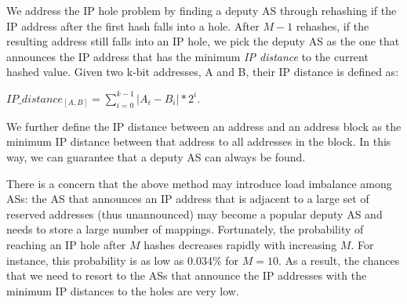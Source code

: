 
We address the IP hole problem by finding a deputy AS through rehashing if the IP address after the first hash falls into a hole. After $M-1$ rehashes, if the resulting address still falls into an IP hole, we pick the deputy AS as the one that announces the IP address that has the minimum \emph{IP distance} to the current hashed value. Given two k-bit addresses, A and B, their IP distance is defined as:
\begin{center}  %
$IP\_distance_{[A,B]} = \displaystyle\sum\limits_{i=0}^{k-1} |A_i - B_i|*2^{i}.$ \end{center}
We further define the IP distance between an address and an address block as the minimum IP distance between that address to all addresses in the block. In this way, we can guarantee that a deputy AS can always be found.

There is a concern that the above method may introduce load imbalance among ASs: the AS that announces an IP address that is adjacent to a large set of reserved addresses (thus unannounced) may become a popular deputy AS and needs to store a large number of mappings. Fortunately, the probability of reaching an IP hole after $M$ hashes decreases rapidly with increasing $M$.
For instance, this probability is as low as 0.034\% for $M=10$. As a result, the chances that we need to resort to the ASs that announce the IP addresses with the minimum IP distances to the holes are very low.

